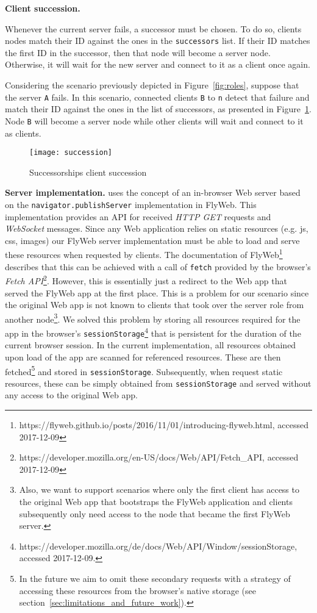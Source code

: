 \noindent\textbf{Client succession.} 

Whenever the current server fails, a successor must be chosen. 
To do so, clients nodes match their ID against the ones in the \texttt{successors} list.
If their ID matches the first ID in the successor, then that node will become a server node.
Otherwise, it will wait for the new server and connect to it as a client once again.

Considering the scenario previously depicted in Figure~\ref{fig:roles}, suppose that the server \texttt{A} fails. In this scenario, connected clients \texttt{B} to \texttt{n} detect that failure and match their ID against the ones in the list of successors, as presented in Figure~\ref{fig:succession}. Node \texttt{B} will become a server node while other clients will wait and connect to it as clients.

\begin{figure}[h]
    \centering
    \texttt{[image: succession]}
    \caption{Successorships client succession}
    \label{fig:succession}
\end{figure}

\noindent\textbf{Server implementation.}
\APIName uses the concept of an in-browser Web server based on the \texttt{navigator.publishServer} implementation in FlyWeb.
This implementation provides an API for received \textit{HTTP GET} requests and \textit{WebSocket} messages.
Since any Web application relies on static resources (e.g. js, css, images) our FlyWeb server implementation must be able to load and serve these resources when requested by clients.
The documentation of FlyWeb\footnote{https://flyweb.github.io/posts/2016/11/01/introducing-flyweb.html, accessed 2017-12-09} describes that this can be achieved with a call of \texttt{fetch} provided by the browser's \textit{Fetch API}\footnote{https://developer.mozilla.org/en-US/docs/Web/API/Fetch\_API, accessed 2017-12-09}.
However, this is essentially just a redirect to the Web app that served the FlyWeb app at the first place.
This is a problem for our scenario since the original Web app is not known to clients that took over the server role from another node\footnote{Also, we want to support scenarios where only the first client has access to the original Web app that bootstraps the FlyWeb application and clients subsequently only need access to the node that became the first FlyWeb server.}.
We solved this problem by storing all resources required for the \APIshort app in the browser's \texttt{sessionStorage}\footnote{https://developer.mozilla.org/de/docs/Web/API/Window/sessionStorage, accessed 2017-12-09.} that is persistent for the duration of the current browser session.
In the current implementation, all resources obtained upon load of the app are scanned for referenced resources.
These are then fetched\footnote{In the future we aim to omit these secondary requests with a strategy of accessing these resources from the browser's native storage (see section~\ref{sec:limitations_and_future_work}).} and stored in \texttt{sessionStorage}.
Subsequently, when \APIshort request static resources, these can be simply obtained from \texttt{sessionStorage} and served without any access to the original Web app.



